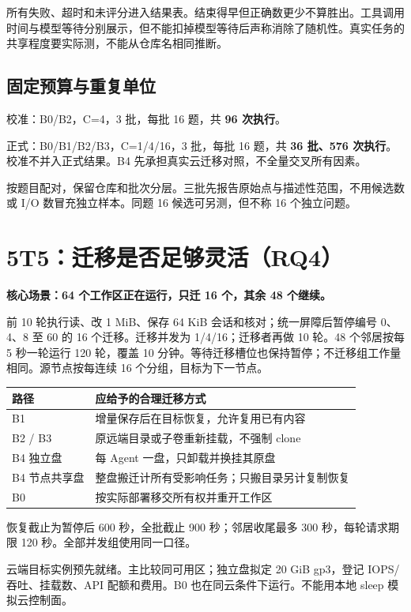 \documentclass[UTF8,11pt,a4paper,fontset=windows]{ctexart}
\begin{document}
所有失败、超时和未评分进入结果表。结束得早但正确数更少不算胜出。工具调用时间与模型等待分别展示，但不能扣掉模型等待后声称消除了随机性。真实任务的共享程度要实际测，不能从仓库名相同推断。

\subsection*{固定预算与重复单位}
校准：B0/B2，C=4，3 批，每批 16 题，共 \textbf{96 次执行}。

正式：B0/B1/B2/B3，C=1/4/16，3 批，每批 16 题，共 \textbf{36 批、576 次执行}。校准不并入正式结果。B4 先承担真实云迁移对照，不全量交叉所有因素。

按题目配对，保留仓库和批次分层。三批先报告原始点与描述性范围，不用候选数或 I/O 数冒充独立样本。同题 16 候选可另测，但不称 16 个独立问题。
\newpage

\section*{5\quad T5：迁移是否足够灵活（RQ4）}
\textbf{核心场景：64 个工作区正在运行，只迁 16 个，其余 48 个继续。}

前 10 轮执行读、改 1 MiB、保存 64 KiB 会话和核对；统一屏障后暂停编号 0、4、8 至 60 的 16 个迁移。迁移并发为 1/4/16；迁移者再做 10 轮。48 个邻居按每 5 秒一轮运行 120 轮，覆盖 10 分钟。等待迁移槽位也保持暂停；不迁移组工作量相同。源节点按每连续 16 个分组，目标为下一节点。

{\small\begin{tabularx}{\linewidth}{@{}P{31mm}Y@{}}
\toprule
路径 & 应给予的合理迁移方式\\
\midrule
B1 & 增量保存后在目标恢复，允许复用已有内容\\
B2 / B3 & 原远端目录或子卷重新挂载，不强制 clone\\
B4 独立盘 & 每 Agent 一盘，只卸载并换挂其原盘\\
B4 节点共享盘 & 整盘搬迁计所有受影响任务；只搬目录另计复制恢复\\
B0 & 按实际部署移交所有权并重开工作区\\
\bottomrule
\end{tabularx}}

恢复截止为暂停后 600 秒，全批截止 900 秒；邻居收尾最多 300 秒，每轮请求期限 120 秒。全部并发组使用同一口径。

云端目标实例预先就绪。主比较同可用区；独立盘拟定 20 GiB gp3，登记 IOPS/吞吐、挂载数、API 配额和费用。B0 也在同云条件下运行。不能用本地 sleep 模拟云控制面。
\end{document}
